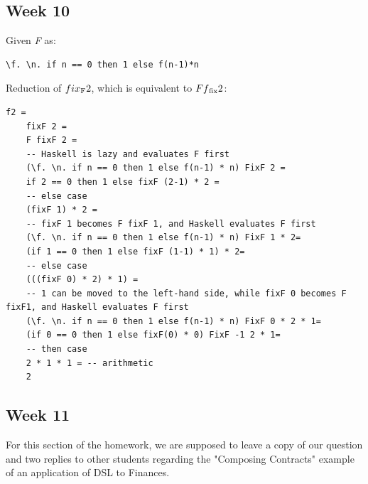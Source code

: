\documentclass{article}
\theoremstyle{theorem}
\theoremstyle{definition}
\theoremstyle{remark}
\begin{document}
\subsection{Week 10}
Given \textit{F} as:
\begin{lstlisting}
\f. \n. if n == 0 then 1 else f(n-1)*n
\end{lstlisting}
Reduction of $fix\textsubscript{F}2$, which is equivalent to $Ff\textsubscript{fix}2$:
\begin{lstlisting}
f2 =
    fixF 2 =
    F fixF 2 =
    -- Haskell is lazy and evaluates F first
    (\f. \n. if n == 0 then 1 else f(n-1) * n) FixF 2 =
    if 2 == 0 then 1 else fixF (2-1) * 2 =
    -- else case
    (fixF 1) * 2 =
    -- fixF 1 becomes F fixF 1, and Haskell evaluates F first
    (\f. \n. if n == 0 then 1 else f(n-1) * n) FixF 1 * 2=
    (if 1 == 0 then 1 else fixF (1-1) * 1) * 2=
    -- else case
    (((fixF 0) * 2) * 1) =
    -- 1 can be moved to the left-hand side, while fixF 0 becomes F fixF1, and Haskell evaluates F first
    (\f. \n. if n == 0 then 1 else f(n-1) * n) FixF 0 * 2 * 1=
    (if 0 == 0 then 1 else fixF(0) * 0) FixF -1 2 * 1=
    -- then case
    2 * 1 * 1 = -- arithmetic
    2
\end{lstlisting}
\subsection{Week 11}
For this section of the homework, we are supposed to leave a copy of our question and two replies to other students regarding the "Composing Contracts" example of an application of DSL to Finances.
\end{document}
